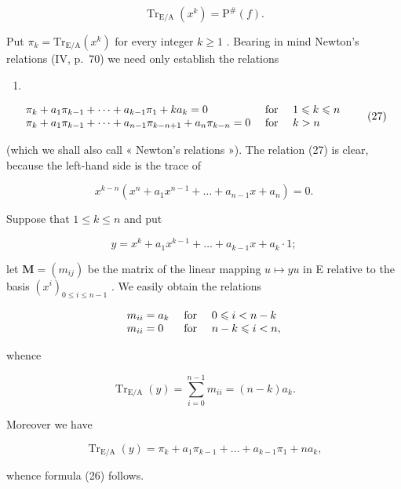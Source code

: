 \[
\operatorname{Tr} _ {\mathrm{E/A}} (x ^ {k}) = \mathrm{P} ^ {\#} (f).\tag{25}
\]

Put \(\pi_k = \mathrm{Tr}_{\mathrm{E / A}}(x^k)\) for every integer \(k \geqslant 1\) . Bearing in mind Newton's relations (IV, p.~70) we need only establish the relations

\begin{enumerate}
\def\labelenumi{(\arabic{enumi})}
\setcounter{enumi}{25}
\tightlist
\item
\end{enumerate}

\[
\begin{array}{l l} \pi_ {k} + a _ {1} \pi_ {k - 1} + \dots + a _ {k - 1} \pi_ {1} + k a _ {k} = 0 & \text { for } \quad 1 \leqslant k \leqslant n \\ \pi_ {k} + a _ {1} \pi_ {k - 1} + \dots + a _ {n - 1} \pi_ {k - n + 1} + a _ {n} \pi_ {k - n} = 0 & \text { for } \quad k > n \end{array}\tag{27}
\]

(which we shall also call « Newton's relations »). The relation (27) is clear, because the left-hand side is the trace of

\[
x ^ {k - n} \left(x ^ {n} + a _ {1} x ^ {n - 1} + \dots + a _ {n - 1} x + a _ {n}\right) = 0.
\]

Suppose that \(1 \leqslant k \leqslant n\) and put

\[
y = x ^ {k} + a _ {1} x ^ {k - 1} + \dots + a _ {k - 1} x + a _ {k} \cdot 1;
\]

let \(\mathbf{M} = (m_{ij})\) be the matrix of the linear mapping \(u\mapsto yu\) in E relative to the basis \((x^{i})_{0\leqslant i\leqslant n-1}\) . We easily obtain the relations

\[
\begin{array}{l l} m _ {i i} = a _ {k} & \text { for } \quad 0 \leqslant i <   n - k \\ m _ {i i} = 0 & \text { for } \quad n - k \leqslant i <   n, \end{array}
\]

whence

\[
\operatorname{Tr} _ {\mathrm{E/A}} (y) = \sum_ {i = 0} ^ {n - 1} m _ {i i} = (n - k) a _ {k}.
\]

Moreover we have

\[
\operatorname{Tr} _ {\mathrm{E/A}} (y) = \pi_ {k} + a _ {1} \pi_ {k - 1} + \dots + a _ {k - 1} \pi_ {1} + n a _ {k},
\]

whence formula (26) follows.

